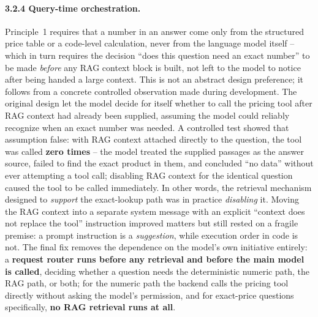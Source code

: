 \documentclass[11pt,a4paper]{article}
\begin{document}
\paragraph{3.2.4 Query-time orchestration.}
Principle~1 requires that a number in an answer come only from the
structured price table or a code-level calculation, never from the language
model itself -- which in turn requires the decision ``does this question
need an exact number'' to be made \emph{before} any RAG context block is
built, not left to the model to notice after being handed a large context.
This is not an abstract design preference; it follows from a concrete
controlled observation made during development. The original design let the
model decide for itself whether to call the pricing tool after RAG context
had already been supplied, assuming the model could reliably recognize when
an exact number was needed. A controlled test showed that assumption false:
with RAG context attached directly to the question, the tool was called
\textbf{zero times} -- the model treated the supplied passages as the
answer source, failed to find the exact product in them, and concluded
``no data'' without ever attempting a tool call; disabling RAG context for
the identical question caused the tool to be called immediately. In other
words, the retrieval mechanism designed to \emph{support} the exact-lookup
path was in practice \emph{disabling} it. Moving the RAG context into a
separate system message with an explicit ``context does not replace the
tool'' instruction improved matters but still rested on a fragile premise: a
prompt instruction is a \emph{suggestion}, while execution order in code is
not. The final fix removes the dependence on the model's own initiative
entirely: a \textbf{request router runs before any retrieval and before the
main model is called}, deciding whether a question needs the deterministic
numeric path, the RAG path, or both; for the numeric path the backend calls
the pricing tool directly without asking the model's permission, and for
exact-price questions specifically, \textbf{no RAG retrieval runs at all}.
\end{document}
